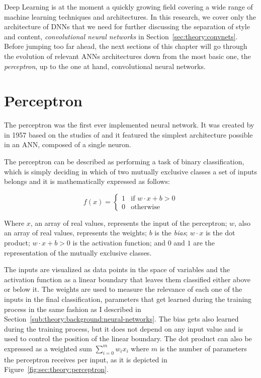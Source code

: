 Deep Learning is at the moment a quickly growing field covering a wide range of machine learning techniques and architectures.
In this research, we cover only the architecture of DNNs that we need for further discussing the separation of style and content, \emph{convolutional neural networks} in Section~\ref{sec:theory:convnets}.
Before jumping too far ahead, the next sections of this chapter will go through the evolution of relevant ANNs architectures down from the most basic one, the \emph{perceptron}, up to the one at hand, convolutional neural networks.



\section{Perceptron}
\label{sec:theory:perceptron}

The perceptron was the first ever implemented neural network.
It was created by \citet{Rosenblatt1958} in 1957 based on the studies of \citet{McCulloch1943} and it featured the simplest architecture possible in an ANN, composed of a single neuron.

The perceptron can be described as performing a task of binary classification, which is simply deciding in which of two mutually exclusive classes a set of inputs belongs \cite{Freund1999} and it is mathematically expressed as follows:

$$
  f(x) =
  \begin{cases}
    1 & \text{if } {w}\cdot{x}+b > 0\\
    0 & \text{otherwise}
  \end{cases}
$$

Where $x$, an array of real values, represents the input of the perceptron; $w$, also an array of real values, represents the weights; $b$ is the \emph{bias}; ${w}\cdot{x}$ is the dot product; ${w}\cdot{x}+b > 0$ is the activation function; and $0$ and $1$ are the representation of the mutually exclusive classes.

The inputs are visualized as data points in the space of variables and the activation function as a linear boundary that leaves them classified either above or below it.
The weights are used to measure the relevance of each one of the inputs in the final classification, parameters that get learned during the training process in the same fashion as I described in Section~\ref{sub:theory:background:neural-networks}.
The bias gets also learned during the training process, but it does not depend on any input value and is used to control the position of the linear boundary.
The dot product can also be expressed as a weighted sum $\sum_{i=0}^{m} w_i x_i$ where $m$ is the number of parameters the perceptron receives per input, as it is depicted in Figure~\ref{fig:sec:theory:perceptron}.

